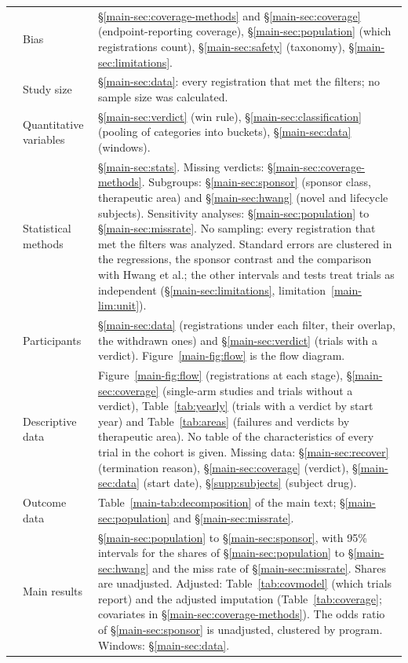 \documentclass[11pt]{article}
\newcounter{strobe}
\newcommand{\strobeitem}{\stepcounter{strobe}\arabic{strobe}}
\begin{document}
\begin{table}[H]
\begin{tabular}{r>{\raggedright\arraybackslash}p{}>{\raggedright\arraybackslash}p{}}
\strobeitem & Bias & \S\ref{main-sec:coverage-methods} and \S\ref{main-sec:coverage} (endpoint-reporting coverage), \S\ref{main-sec:population} (which registrations count), \S\ref{main-sec:safety} (taxonomy), \S\ref{main-sec:limitations}. \\
\strobeitem & Study size & \S\ref{main-sec:data}: every registration that met the filters; no sample size was calculated. \\
\strobeitem & Quantitative variables & \S\ref{main-sec:verdict} (win rule), \S\ref{main-sec:classification} (pooling of categories into buckets), \S\ref{main-sec:data} (windows). \\
\strobeitem & Statistical methods & \S\ref{main-sec:stats}. Missing verdicts: \S\ref{main-sec:coverage-methods}. Subgroups: \S\ref{main-sec:sponsor} (sponsor class, therapeutic area) and \S\ref{main-sec:hwang} (novel and lifecycle subjects). Sensitivity analyses: \S\ref{main-sec:population} to \S\ref{main-sec:missrate}. No sampling: every registration that met the filters was analyzed. Standard errors are clustered in the regressions, the sponsor contrast and the comparison with Hwang et al.; the other intervals and tests treat trials as independent (\S\ref{main-sec:limitations}, limitation~\ref{main-lim:unit}). \\
\strobeitem & Participants & \S\ref{main-sec:data} (registrations under each filter, their overlap, the withdrawn ones) and \S\ref{main-sec:verdict} (trials with a verdict). Figure~\ref{main-fig:flow} is the flow diagram. \\
\strobeitem & Descriptive data & Figure~\ref{main-fig:flow} (registrations at each stage), \S\ref{main-sec:coverage} (single-arm studies and trials without a verdict), Table~\ref{tab:yearly} (trials with a verdict by start year) and Table~\ref{tab:areas} (failures and verdicts by therapeutic area). No table of the characteristics of every trial in the cohort is given. Missing data: \S\ref{main-sec:recover} (termination reason), \S\ref{main-sec:coverage} (verdict), \S\ref{main-sec:data} (start date), \S\ref{supp:subjects} (subject drug). \\
\strobeitem & Outcome data & Table~\ref{main-tab:decomposition} of the main text; \S\ref{main-sec:population} and \S\ref{main-sec:missrate}. \\
\strobeitem & Main results & \S\ref{main-sec:population} to \S\ref{main-sec:sponsor}, with 95\% intervals for the shares of \S\ref{main-sec:population} to \S\ref{main-sec:hwang} and the miss rate of \S\ref{main-sec:missrate}. Shares are unadjusted. Adjusted: Table~\ref{tab:covmodel} (which trials report) and the adjusted imputation (Table~\ref{tab:coverage}; covariates in \S\ref{main-sec:coverage-methods}). The odds ratio of \S\ref{main-sec:sponsor} is unadjusted, clustered by program. Windows: \S\ref{main-sec:data}. \\

\end{tabular}
\end{table}
\end{document}
